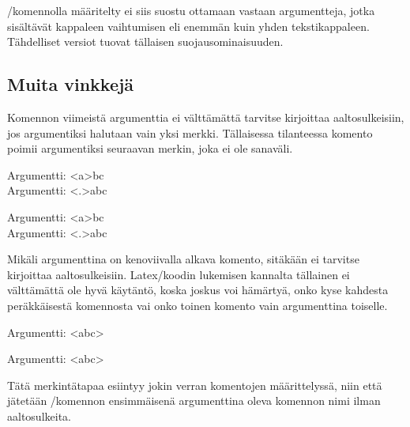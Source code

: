 \-/komennolla määritelty 
ei siis suostu ottamaan vastaan argumentteja, jotka sisältävät kappaleen
vaihtumisen eli enemmän kuin yhden tekstikappaleen. Tähdelliset versiot
tuovat tällaisen suo\-jaus\-omi\-nai\-suu\-den.

\subsection{Muita vinkkejä}
\label{luku:komennot-lisä}

Komennon viimeistä argumenttia ei välttämättä tarvitse kirjoittaa
aaltosulkeisiin, jos argumentiksi halutaan vain yksi merkki. Tällaisessa
tilanteessa komento poimii argumentiksi seuraavan merkin, joka ei ole
sanaväli.


\begin{koodilohkosis}
  \newcommand{\x}[1]{Argumentti: <#1>}
  \x abc \\
  \x.abc
\end{koodilohkosis}

\begin{tulossis}
  Argumentti: <a>bc \\
  Argumentti: <.>abc
\end{tulossis}

Mikäli argumenttina on kenoviivalla alkava komento, sitäkään ei tarvitse
kirjoittaa aaltosulkeisiin. Latex\-/koodin lukemisen kannalta tällainen
ei välttämättä ole hyvä käytäntö, koska joskus voi hämärtyä, onko kyse
kahdesta peräkkäisestä komennosta vai onko toinen komento vain
argumenttina toiselle.


\begin{koodilohkosis}
  \newcommand{\x}[1]{Argumentti: <#1>}
  \newcommand{\yyy}{abc}
  \x\yyy
\end{koodilohkosis}

\begin{tulossis}
  Argumentti: <abc>
\end{tulossis}

Tätä merkintätapaa esiintyy jokin verran komentojen määrittelyssä, niin
että jätetään \-/komennon ensimmäisenä
argumenttina oleva komennon nimi ilman aaltosulkeita.

\begin{koodilohkosis}
  \newcommand\yyy{abc}
\end{koodilohkosis}

